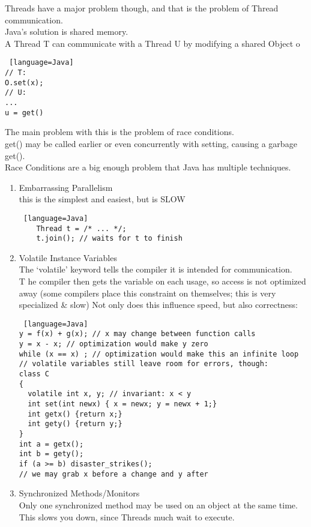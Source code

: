 \documentclass[../../lecture_notes.tex]{subfiles}
\begin{document}
\noindent Threads have a major problem though, and that is the problem of Thread communication.\\
Java’s solution is shared memory.\\
 A Thread T can communicate with a Thread U by modifying a shared Object o
 \begin{lstlisting} [language=Java]
// T:
O.set(x);
// U:
... 
u = get()		
\end{lstlisting}
\noindent The main problem with this is the problem of race conditions.\\
get() may be called earlier or even concurrently with setting, causing a garbage get().\\
Race Conditions are a big enough problem that Java has multiple techniques.
\begin{enumerate} [itemsep=0mm]
	\item Embarrassing Parallelism\\
		this is the simplest and easiest, but is SLOW
		\begin{lstlisting} [language=Java]
	Thread t = /* ... */;
	t.join(); // waits for t to finish
		\end{lstlisting}
	\item Volatile Instance Variables\\
		The ‘volatile’ keyword tells the compiler it is intended for communication.\\
		T he compiler then gets the variable on each usage, so access is not optimized away
		(some compilers place this constraint on themselves; this is very specialized \& slow)
		Not only does this influence speed, but also correctness:
		\begin{lstlisting} [language=Java]
y = f(x) + g(x); // x may change between function calls
y = x - x; // optimization would make y zero
while (x == x) ; // optimization would make this an infinite loop
// volatile variables still leave room for errors, though:
class C
{
  volatile int x, y; // invariant: x < y
  int set(int newx) { x = newx; y = newx + 1;}
  int getx() {return x;}
  int gety() {return y;}
}
int a = getx();
int b = gety();
if (a >= b) disaster_strikes(); 
// we may grab x before a change and y after
		\end{lstlisting}
	\item Synchronized Methods/Monitors\\
		Only one synchronized method may be used on an object at the same time.\\
		This slows you down, since Threads much wait to execute.\\

\end{enumerate}
\end{document}
